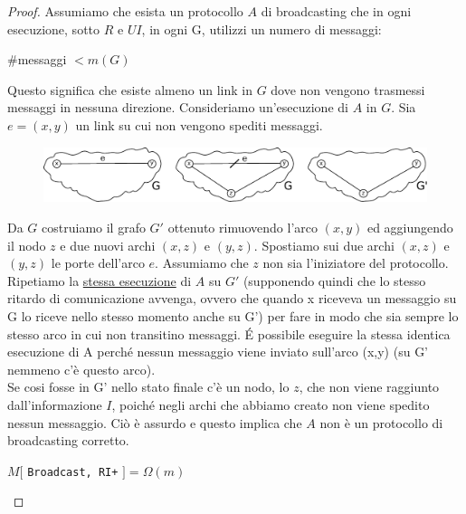 \begin{proof}
    Assumiamo che esista un protocollo $A$ di broadcasting che in ogni
    esecuzione, sotto $R$ e $UI$, in ogni G, utilizzi un numero di messaggi:

    \begin{center}
        \#messaggi $< m(G)$
    \end{center}

    Questo significa che esiste almeno un link in $G$ dove non vengono trasmessi
    messaggi in nessuna direzione. Consideriamo un'esecuzione di $A$ in $G$. Sia
    $e=(x, y)$ un link su cui non vengono spediti messaggi.

    \begin{figure}[H]
        \centering
        \includegraphics[width=13cm, keepaspectratio]{capitoli/broadcast/imgs/n_09}
    \end{figure}

    Da $G$ costruiamo il grafo $G'$ ottenuto rimuovendo l'arco $(x, y)$ ed
    aggiungendo il nodo $z$ e due nuovi archi $(x, z)$ e $(y, z)$. Spostiamo sui
    due archi $(x, z)$ e $(y, z)$ le porte dell'arco $e$. Assumiamo che   $z$
    non sia l'iniziatore del protocollo. Ripetiamo la \underline{stessa
        esecuzione} di $A$ su $G'$ (supponendo quindi che lo stesso ritardo di
    comunicazione avvenga, ovvero che quando x riceveva un messaggio su G lo
    riceve nello stesso momento anche su G') per fare in modo che sia sempre lo
    stesso arco in cui non transitino messaggi. \'E possibile eseguire la stessa
    identica esecuzione di A perché nessun messaggio viene inviato sull'arco
    (x,y) (su G' nemmeno c'è questo arco).\\
    Se cosi fosse in G' nello stato finale c'è un nodo, lo $z$, che non viene
    raggiunto dall'informazione $I$, poiché negli archi che abbiamo creato non
    viene spedito nessun messaggio. Ciò è assurdo e questo implica che $A$ non è
    un protocollo di broadcasting corretto.

    \begin{center}
        $M[$ \texttt{Broadcast, RI+} $] = \Omega(m)$
    \end{center}

\end{proof}

